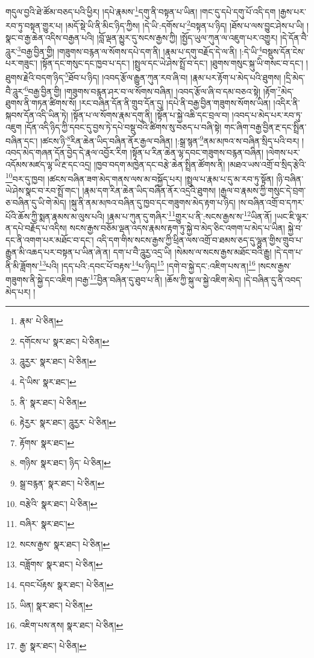 གདུལ་བྱའི་ཐེ་ཚོམ་བཅད་པའི་ཕྱིར། །དཔེ་རྣམས་\footnote{རྣམ་  པེ་ཅིན། }དགུ་ནི་བསྟན་པ་ཡིན། །གང་དུ་དཔེ་དགུ་པོ་འདི་དག །རྒྱས་པར་རབ་ཏུ་བསྟན་གྱུར་པ། །མདོ་སྡེ་ཡི་ནི་མིང་ཉིད་ཀྱིས། །དེ་ཡི་:དགོས་པ་\footnote{དགོངས་པ་  སྣར་ཐང་།  པེ་ཅིན། }བསྟན་པ་ཉིད། །ཐོས་པ་ལས་བྱུང་ཤེས་པ་ཡི། །སྣང་བ་རྒྱ་ཆེན་འདིས་བརྒྱན་པའི། །བློ་ལྡན་མྱུར་དུ་སངས་རྒྱས་ཀྱི། །སྤྱོད་ཡུལ་ཀུན་ལ་འཇུག་པར་འགྱུར། །དེ་དོན་བཻ་ཌཱུར་\footnote{ཌཱུརྱར་  སྣར་ཐང་།  པེ་ཅིན། }བརྒྱ་བྱིན་གྱི། །གཟུགས་བརྙན་ལ་སོགས་དཔེ་དག་ནི། །རྣམ་པ་དགུ་བརྗོད་དེ་ལ་ནི། །:དེ་ཡི་\footnote{དེ་ཡིས་  སྣར་ཐང་། }བསྡུས་དོན་ངེས་པར་གཟུང་། །སྟོན་དང་གསུང་དང་ཁྱབ་པ་དང་། །སྤྲུལ་དང་ཡེ་ཤེས་སྤྲོ་བ་དང་། །ཐུགས་གསུང་སྐུ་ཡི་གསང་བ་དང་། །ཐུགས་རྗེའི་བདག་ཉིད་\footnote{ནི་  སྣར་ཐང་།  པེ་ཅིན། }ཐོབ་པ་ཉིད། །འབད་རྩོལ་རྒྱུན་ཀུན་རབ་ཞི་བ། །རྣམ་པར་རྟོག་པ་མེད་པའི་ཐུགས། །དྲི་མེད་བཻ་ཌཱུར་\footnote{རྟེརྱར་  སྣར་ཐང་། ཌཱུརྱར་  པེ་ཅིན། }བརྒྱ་བྱིན་གྱི། །གཟུགས་བརྙན་ཤར་བ་ལ་སོགས་བཞིན། །འབད་རྩོལ་ཞི་བ་དམ་བཅའ་སྟེ། །རྟོག་\footnote{རྟོགས་  སྣར་ཐང་། }མེད་ཐུགས་ནི་གཏན་ཚིགས་སོ། །རང་བཞིན་དོན་ནི་གྲུབ་དོན་དུ། །དཔེ་ནི་བརྒྱ་བྱིན་གཟུགས་སོགས་ཡིན། །འདིར་ནི་སྐབས་དོན་འདི་ཡིན་ཏེ། །སྟོན་པ་ལ་སོགས་རྣམ་དགུ་ནི། །སྟོན་པ་སྐྱེ་འཆི་དང་བྲལ་བ། །འབད་པ་མེད་པར་རབ་ཏུ་འཇུག །དོན་འདི་ཉིད་ཀྱི་དབང་དུ་བྱས་ཏེ་དཔེ་བསྡུ་བའི་ཚིགས་སུ་བཅད་པ་བཞི་སྟེ། གང་ཞིག་བརྒྱ་བྱིན་རྔ་དང་སྤྲིན་བཞིན་དང་། །ཚངས་ཉི་\footnote{གཉིས་  སྣར་ཐང་། ཉིད་  པེ་ཅིན། }རིན་ཆེན་ཡིད་བཞིན་ནོར་རྒྱལ་བཞིན། །:སྒྲ་སྙན་\footnote{སྒྲ་བརྙན་  སྣར་ཐང་།  པེ་ཅིན། }ནམ་མཁའ་ས་བཞིན་སྲིད་པའི་བར། །འབད་མེད་གཞན་དོན་བྱེད་དེ་རྣལ་འབྱོར་རིག །སྟོན་པ་རིན་ཆེན་ལྷ་དབང་གཟུགས་བརྙན་བཞིན། །ལེགས་པར་འདོམས་མཛད་ལྷ་ཡི་རྔ་དང་འདྲ། །ཁྱབ་བདག་མཁྱེན་དང་བརྩེ་ཆེན་སྤྲིན་ཚོགས་ནི། །མཐའ་ཡས་འགྲོ་བ་སྲིད་རྩེའི་\footnote{བརྩེའི་  སྣར་ཐང་།  པེ་ཅིན། }བར་དུ་ཁྱབ། །ཚངས་བཞིན་ཟག་མེད་གནས་ལས་མ་བསྐྱོད་པར། །སྤྲུལ་པ་རྣམ་པ་དུ་མ་རབ་ཏུ་སྟོན། །ཉི་བཞིན་ཡེ་ཤེས་སྣང་བ་རབ་སྤྲོ་གང་། །རྣམ་དག་རིན་ཆེན་ཡིད་བཞིན་ནོར་འདྲའི་ཐུགས། །རྒྱལ་བ་རྣམས་ཀྱི་གསུང་དེ་བྲག་ཅ་བཞིན་དུ་ཡི་གེ་མེད། །སྐུ་ནི་ནམ་མཁའ་བཞིན་དུ་ཁྱབ་དང་གཟུགས་མེད་རྟག་པ་ཉིད། །ས་བཞིན་འགྲོ་བ་དཀར་པོའི་ཆོས་ཀྱི་སྨན་རྣམས་མ་ལུས་པའི། །རྣམ་པ་ཀུན་དུ་གཞིར་\footnote{བཞིར་  སྣར་ཐང་། }གྱུར་པ་ནི་:སངས་རྒྱས་ས་\footnote{སངས་རྒྱས་  སྣར་ཐང་།  པེ་ཅིན། }ཡིན་ནོ། །ཡང་ཇི་ལྟར་ན་དཔེ་བརྗོད་པ་འདིས། སངས་རྒྱས་བཅོམ་ལྡན་འདས་རྣམས་རྟག་ཏུ་སྐྱེ་བ་མེད་ཅིང་འགག་པ་མེད་པ་ཡིན། སྐྱེ་བ་དང་ནི་འགག་པར་མཐོང་བ་དང་། འདི་དག་གིས་སངས་རྒྱས་ཀྱི་ཕྲིན་ལས་འགྲོ་བ་ཐམས་ཅད་དུ་ལྷུན་གྱིས་གྲུབ་པ་རྒྱུན་མི་འཆད་པར་བསྟན་པ་ཡིན་ཞེ་ན། དག་པ་བཻ་ཌཱུརྱ་འདྲ་ཡི། །སེམས་ལ་སངས་རྒྱས་མཐོང་བའི་རྒྱུ། །དེ་དག་པ་ནི་མི་ཟློགས་\footnote{བཟློགས་  སྣར་ཐང་།  པེ་ཅིན། }པའི། །དད་པའི་:དབང་པོ་བརྟས་\footnote{དབང་པོརྟས་  སྣར་ཐང་།  པེ་ཅིན། }པ་ཉིད།\footnote{ཡིན།  སྣར་ཐང་།  པེ་ཅིན། } །དགེ་བ་སྐྱེ་དང་:འཇིག་པས་ན།\footnote{འཇིག་པས་ནས།  སྣར་ཐང་།  པེ་ཅིན། } །སངས་རྒྱས་གཟུགས་ནི་སྐྱེ་དང་འཇིག །བརྒྱ་\footnote{རྒྱ་  སྣར་ཐང་།  པེ་ཅིན། }བྱིན་བཞིན་དུ་ཐུབ་པ་ནི། །ཆོས་ཀྱི་སྐུ་ལ་སྐྱེ་འཇིག་མེད། །དེ་བཞིན་དུ་ནི་འབད་མེད་པར། །
